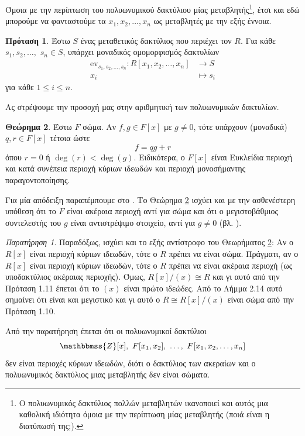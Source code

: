 \documentclass[12pt,a4paper,reqno]{amsart}
\theoremstyle{definition}
\newtheorem{theorem}{Θεώρημα}
\newtheorem{proposition}[theorem]{Πρόταση}
\theoremstyle{remark}
\newtheorem*{remark}{Παρατήρηση}
\numberwithin{theorem}{section}
\numberwithin{exercise}{section}
\numberwithin{equation}{section}
\newcommand{\ZZ}{\mathbbmss{Z}}
\renewcommand{\to}{\rightarrow}
\newcommand{\ev}{\mathrm{ev}}
\begin{document}
Όμοια με την περίπτωση του πολυωνυμικού δακτύλιου μίας μεταβλητής\footnote{Ο πολυωνυμικός δακτύλιος πολλών μεταβλητών ικανοποιεί και αυτός μια καθολική ιδιότητα όμοια με την περίπτωση μίας μεταβλητής (ποιά είναι η διατύπωσή της;).}, έτσι και εδώ μπορούμε να φανταστούμε τα $x_1, x_2, \dots, x_n$ ως μεταβλητές με την εξής έννοια.
\begin{proposition}
    \label{prop:evaluation_hom_multivariable}
    Έστω $S$ ένας μεταθετικός δακτύλιος που περιέχει τον $R$. Για κάθε $s_1, s_2, \dots,$ $s_n \in S$, υπάρχει μοναδικός ομομορφισμός δακτυλίων 
    \begin{align*}
        \ev_{s_1, s_2, \dots, s_n} : R[x_1, x_2, \dots, x_n] &\to S \\
                   x_i &\mapsto s_i
    \end{align*}
    για κάθε $1 \le i \le n$.
\end{proposition}

Ας στρέψουμε την προσοχή μας στην αριθμητική των πολυωνυμικών δακτυλίων.
\begin{theorem}
    \label{thm:polynomial_rings_are_ED}
    Έστω $F$ σώμα. Αν $f, g \in F[x]$ με $g \neq 0$, τότε υπάρχουν (μοναδικά) $q, r \in F[x]$ τέτοια ώστε 
    \[
    f = qg + r
    \]
    όπου $r=0$ ή $\deg(r) < \deg(g)$. Ειδικότερα, ο $F[x]$ είναι Ευκλείδια περιοχή και κατά συνέπεια περιοχή κύριων ιδεωδών και περιοχή μονοσήμαντης παραγοντοποίησης.
\end{theorem}

Για μία απόδειξη παραπέμπουμε στο \cite[Θεώρημα~2.3.3]{VDEMT13}. Το Θεώρημα \ref{thm:polynomial_rings_are_ED} ισχύει και με την ασθενέστερη υπόθεση ότι το $F$ είναι ακέραια περιοχή αντί για σώμα και ότι ο μεγιστοβάθμιος συντελεστής του $g$ είναι αντιστρέψιμο στοιχείο, αντί για $g \neq 0$ (βλ. \cite[Θεώρημα~2.3.5]{VDEMT13}). 

\begin{remark} 
    Παραδόξως, ισχύει και το εξής αντίστροφο του Θεωρήματος \ref{thm:polynomial_rings_are_ED}: Αν ο $R[x]$ είναι περιοχή κύριων ιδεωδών, τότε ο $R$ πρέπει να είναι σώμα. Πράγματι, αν ο $R[x]$ είναι περιοχή κύριων ιδεωδών, τότε ο $R$ πρέπει να είναι ακέραια περιοχή (ως υποδακτύλιος ακέραιας περιοχής). Όμως, $R[x]/(x) \cong R$ και γι αυτό από την Πρόταση 1.11 έπεται ότι το $(x)$ είναι πρώτο ιδεώδες. Από το Λήμμα 2.14 αυτό σημαίνει ότι είναι και μεγιστικό και γι αυτό ο $R \cong R[x]/(x)$ είναι σώμα από την Πρόταση 1.10.
\end{remark}

Από την παρατήρηση έπεται ότι οι πολυωνυμικοί δακτύλιοι 
\[
\ZZ[x], \ F[x_1, x_2], \ \dots, \ F[x_1, x_2, \dots, x_n]
\]
δεν είναι περιοχές κύριων ιδεωδών, διότι ο δακτύλιος των ακεραίων και ο πολυωνυμικός δακτύλιος μιας μεταβλητής δεν είναι σώματα. 
\end{document}
